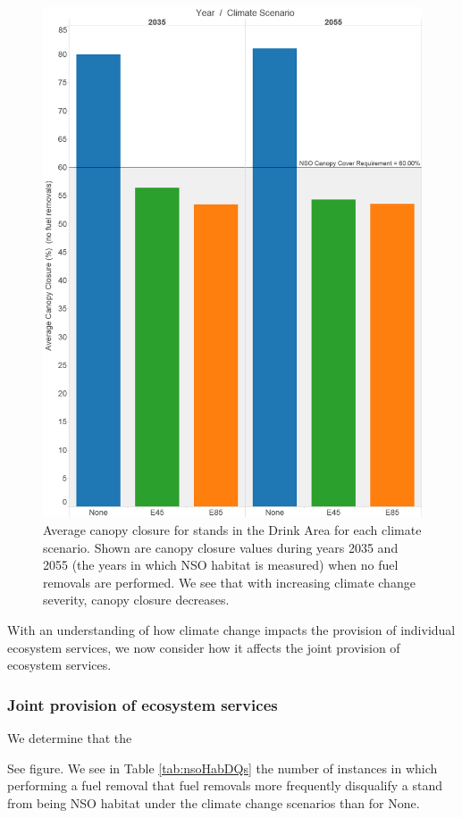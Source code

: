 \begin{figure}[ht]
\centering
\includegraphics[width=.5\textwidth]{../images/AvgCanopyCover_NoTrtmts}
\caption[Average canopy closure in the Drink Area across climate scenarios]{Average canopy closure for stands in the Drink Area for each climate scenario. Shown are canopy closure values during years 2035 and 2055 (the years in which NSO habitat is measured) when no fuel removals are performed. We see that with increasing climate change severity, canopy closure decreases.}
\label{fig:canopyClosure}
\end{figure}

With an understanding of how climate change impacts the provision of individual ecosystem services, we now consider how it affects the joint provision of ecosystem services.

\subsubsection{Joint provision of ecosystem services}
We determine that the 

See figure. We see in Table \ref{tab:nsoHabDQs} the number of instances in which performing a fuel removal that fuel removals more frequently disqualify a stand from being NSO habitat under the climate change scenarios than for None.

